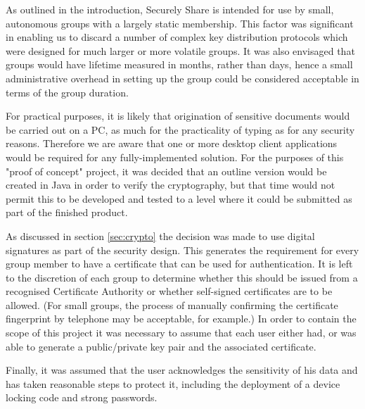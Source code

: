 As outlined in the introduction, Securely Share is intended for use by small, autonomous groups  with a largely static membership.  This factor was significant in enabling us to discard a number of complex key distribution protocols which were designed for much larger or more volatile groups.  It was also envisaged that groups would have lifetime measured in months, rather than days, hence a small administrative overhead in setting up the group could be considered acceptable in terms of the group duration. 

For practical purposes, it is likely that origination of sensitive documents would be carried out on a PC, as much for the practicality of typing as for any security reasons.  Therefore we are aware that one or more desktop client applications would be required for any fully-implemented solution.  For the purposes of this "proof of concept" project, it was decided that an outline version would be created in Java in order to verify the cryptography, but that time would not permit this to be developed and tested to a level where it could be submitted as part of the finished product.  

As discussed in section \ref{sec:crypto} the decision was made to use digital signatures as part of the security design. This generates the requirement for every group member to have a certificate that can be used for authentication. It is left to the discretion of each group to determine  whether this should be issued from a recognised Certificate Authority or whether self-signed certificates are to be allowed.  (For small groups, the process of manually confirming the certificate fingerprint by telephone may be acceptable, for example.)  In order to contain the scope of this project it was necessary to assume that each user either had, or was able to generate a public/private key pair and the associated certificate.  

Finally, it was assumed that the user acknowledges the sensitivity of his data and has taken reasonable steps to protect it, including the deployment of a device locking code and strong passwords.  

